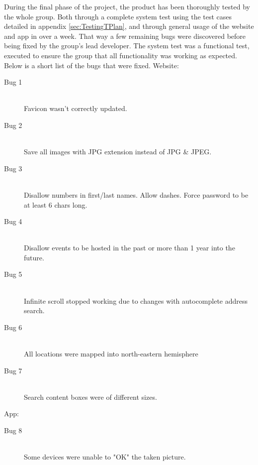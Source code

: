 During the final phase of the project, the product has been thoroughly tested by the whole group. Both through a complete system test using the test cases detailed in appendix \ref{sec:TestingTPlan}, and through general usage of the website and app in over a week. That way a few remaining bugs were discovered before being fixed by the group’s lead developer. The system test was a functional test, executed to ensure the group that all functionality was working as expected. Below is a short list of the bugs that were fixed. 
\medskip
Website: 
\begin{description}
  \item[Bug 1] \hfill \\
  Favicon wasn't correctly updated.
  \item[Bug 2] \hfill \\
  Save all images with JPG extension instead of JPG \& JPEG.
  \item[Bug 3] \hfill \\
  Disallow numbers in first/last names. Allow dashes. Force password to be at least 6 chars long.
  \item[Bug 4] \hfill \\
  Disallow events to be hosted in the past or more than 1 year into the future.
  \item[Bug 5] \hfill \\
  Infinite scroll stopped working due to changes with autocomplete address search.
  \item[Bug 6] \hfill \\
  All locations were mapped into north-eastern hemisphere
  \item[Bug 7] \hfill \\
  Search content boxes were of different sizes.
\end{description}
\medskip
App: 
\begin{description}
  \item[Bug 8] \hfill \\
  Some devices were unable to "OK" the taken picture.
\end{description}
%

